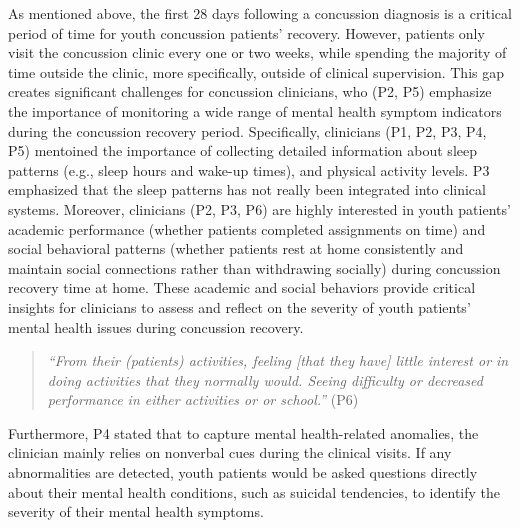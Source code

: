 As mentioned above, the first 28 days following a concussion diagnosis is a critical period of time for youth concussion patients' recovery.
However, patients only visit the concussion clinic every one or two weeks, while spending the majority of time outside the clinic, more specifically, outside of clinical supervision.
This gap creates significant challenges for concussion clinicians, who (P2, P5) emphasize the importance of monitoring a wide range of mental health symptom indicators during the concussion recovery period. 
Specifically, clinicians (P1, P2, P3, P4, P5) mentoined the importance of collecting detailed information about sleep patterns (e.g., sleep hours and wake-up times), and physical activity levels. 
P3 emphasized that the sleep patterns has not really been integrated into clinical systems.
Moreover, clinicians (P2, P3, P6) are highly interested in youth patients' academic performance (whether patients completed assignments on time) and social behavioral patterns (whether patients rest at home consistently and maintain social connections rather than withdrawing socially) during concussion recovery time at home. These academic and social behaviors provide critical insights for clinicians to assess and reflect on the severity of youth patients' mental health issues during concussion recovery.
\begin{quote}
    \textit{``From their (patients) activities, feeling [that they have] little interest or in doing activities that they normally would. Seeing difficulty or decreased performance in either activities or or school.''} (P6)
\end{quote}
Furthermore, P4 stated that to capture mental health-related anomalies, the clinician mainly relies on nonverbal cues during the clinical visits.
If any abnormalities are detected, youth patients would be asked questions directly about their mental health conditions, such as suicidal tendencies, to identify the severity of their mental health symptoms.
